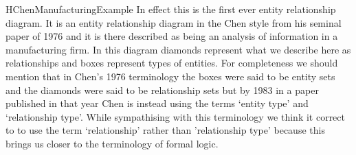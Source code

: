 \begin{erboxedFigure} {H}{ChenManufacturingExample}{
In effect this is the first ever entity relationship diagram. It is an entity relationship diagram in the Chen style from his seminal paper of 1976 and it is there described as being an analysis of information in a manufacturing firm. In this diagram
diamonds represent what we describe here as relationships and boxes represent types of entities.  
For completeness we should mention that in Chen's 1976 terminology the boxes were said to be entity sets and the diamonds were said to be relationship sets but by 1983 in a paper published in that year Chen is instead using the terms `entity type' and `relationship type'. While sympathising with this terminology we think it correct to to use the term `relationship' rather than 'relationship type' because this brings us closer to the terminology of formal logic.
}
\begin{center}
\scalebox{0.80}{}
\end{center}
\end{erboxedFigure}

